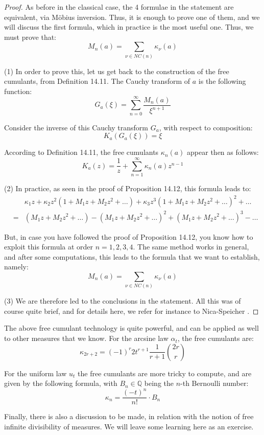 \documentclass[12pt]{amsbook}
\begin{document}
\begin{proof}
As before in the classical case, the 4 formulae in the statement are equivalent, via M\"obius inversion. Thus, it is enough to prove one of them, and we will discuss the first formula, which in practice is the most useful one. Thus, we must prove that:
$$M_n(a)=\sum_{\nu\in NC(n)}\kappa_\nu(a)$$

(1) In order to prove this, let us get back to the construction of the free cumulants, from Definition 14.11. The Cauchy transform of $a$ is the following function:
$$G_a(\xi)=\sum_{n=0}^\infty\frac{M_n(a)}{\xi^{n+1}}$$

Consider the inverse of this Cauchy transform $G_a$, with respect to composition:
$$K_a(G_a(\xi))=\xi$$

According to Definition 14.11, the free cumulants $\kappa_n(a)$ appear then as follows:
$$K_a(z)=\frac{1}{z}+\sum_{n=1}^\infty\kappa_n(a)z^{n-1}$$

(2) In practice, as seen in the proof of Proposition 14.12, this formula leads to:
\begin{eqnarray*}
&&\kappa_1z+\kappa_2z^2(1+M_1z+M_2z^2+\ldots)+\kappa_3z^3(1+M_1z+M_2z^2+\ldots)^2+\ldots\\
&=&(M_1z+M_2z^2+\ldots)-(M_1z+M_2z^2+\ldots)^2+(M_1z+M_2z^2+\ldots)^3-\ldots
\end{eqnarray*}

But, in case you have followed the proof of Proposition 14.12, you know how to exploit this formula at order $n=1,2,3,4$. The same method works in general, and after some computations, this leads to the formula that we want to establish, namely:
$$M_n(a)=\sum_{\nu\in NC(n)}\kappa_\nu(a)$$

(3) We are therefore led to the conclusions in the statement. All this was of course quite brief, and for details here, we refer for instance to Nica-Speicher \cite{nsp}.
\end{proof}

The above free cumulant technology is quite powerful, and can be applied as well to other measures that we know. For the arcsine law $\alpha_t$, the free cumulants are:
$$\kappa_{2r+2}=(-1)^r2t^{r+1}\frac{1}{r+1}\binom{2r}{r}$$

For the uniform law $u_t$ the free cumulants are more tricky to compute, and are given by the following formula, with $B_n\in\mathbb Q$ being the $n$-th Bernoulli number:
$$\kappa_n=\frac{(-t)^n}{n!}\cdot B_n$$

Finally, there is also a discussion to be made, in relation with the notion of free infinite divisibility of measures. We will leave some learning here as an exercise.
\end{document}

